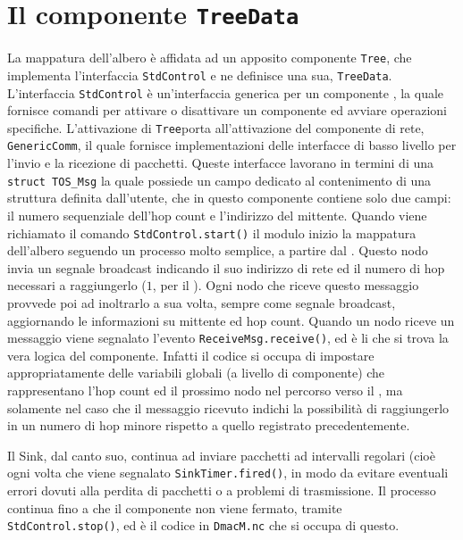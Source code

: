 \documentclass[twoside,11pt,a4paper,italian,openany]{book}
\begin{document}
\newcommand{\treedata}{\texttt{TreeData}}
\newcommand{\tree}{\texttt{Tree}}

\section{Il componente \treedata}
La mappatura dell'albero è affidata ad un apposito componente \tree, che implementa l'interfaccia
\texttt{StdControl} e ne definisce una sua, \treedata.
L'interfaccia \texttt{StdControl} è un'interfaccia generica per un componente \nesc, 
la quale fornisce comandi per attivare o disattivare un componente
 ed avviare operazioni specifiche.
L'attivazione di \tree porta all'attivazione del componente di rete, \texttt{GenericComm}, 
il quale fornisce implementazioni delle interfacce di basso livello per l'invio e la ricezione 
di pacchetti. 
Queste interfacce lavorano in termini di una \texttt{struct TOS\_Msg} la quale possiede un 
campo dedicato al contenimento di una struttura definita dall'utente, che in questo
componente contiene solo due campi: il numero sequenziale dell'hop count e l'indirizzo del mittente. 
Quando viene richiamato il comando \texttt{StdControl.start()} il modulo inizio la mappatura 
dell'albero seguendo un processo molto semplice, a partire dal \sink. 
Questo nodo invia un segnale broadcast indicando il suo indirizzo di rete ed il numero di hop 
necessari a raggiungerlo ($1$, per il \sink). Ogni nodo che riceve questo messaggio provvede 
poi ad inoltrarlo a sua volta, sempre come segnale broadcast, aggiornando le
informazioni su mittente ed hop count. 
Quando un nodo riceve un messaggio viene segnalato l'evento 
\texttt{ReceiveMsg.receive()}, ed è li che si trova la vera logica del componente. 
Infatti il codice si occupa di impostare appropriatamente delle variabili globali 
(a livello di componente) che rappresentano l'hop count ed il prossimo nodo nel percorso verso 
il \sink, ma solamente nel caso che il messaggio ricevuto indichi la possibilità di raggiungerlo
in un numero di hop minore rispetto a quello registrato precedentemente. 

Il Sink, dal canto suo, continua ad inviare pacchetti ad intervalli regolari (cioè ogni volta 
che viene segnalato \texttt{SinkTimer.fired()}, in modo da evitare eventuali errori dovuti alla 
perdita di pacchetti o a problemi di trasmissione.
Il processo continua fino a che il componente non viene fermato, tramite 
\texttt{StdControl.stop()}, ed è il codice in \texttt{DmacM.nc} che si occupa di questo.
\end{document}
